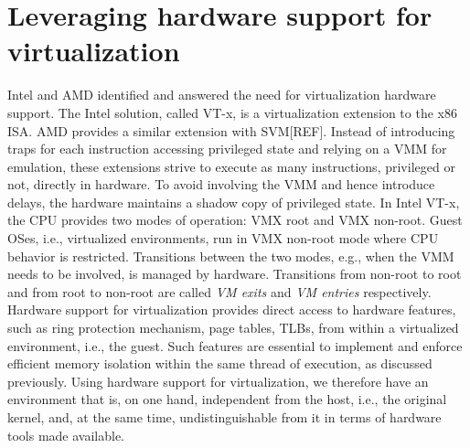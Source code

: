 \documentclass[letterpaper,twocolumn,10pt]{article}
\begin{document}
\section{Leveraging hardware support for virtualization}

Intel and AMD identified and answered the need for virtualization hardware support.
The Intel solution, called VT-x, is a virtualization extension to the x86 ISA.
AMD provides a similar extension with SVM[REF].
Instead of introducing traps for each instruction accessing privileged state and relying on a VMM for emulation, these extensions strive to execute as many instructions, privileged or not, directly in hardware.
To avoid involving the VMM and hence introduce delays, the hardware maintains a shadow copy of privileged state.
In Intel VT-x, the CPU provides two modes of operation: VMX root and VMX non-root.
Guest OSes, i.e., virtualized environments, run in VMX non-root mode where CPU behavior is restricted.
Transitions between the two modes, e.g., when the VMM needs to be involved, is managed by hardware.
Transitions from non-root to root and from root to non-root are called \emph{VM exits} and \emph{VM entries} respectively. \\

Hardware support for virtualization provides direct access to hardware features, such as ring protection mechanism, page tables, TLBs, from within a virtualized environment, i.e., the guest.
Such features are essential to implement and enforce efficient memory isolation within the same thread of execution, as discussed previously.
Using hardware support for virtualization, we therefore have an environment that is, on one hand, independent from the host, i.e., the original kernel, and, at the same time, undistinguishable from it in terms of hardware tools made available. \\
\end{document}
